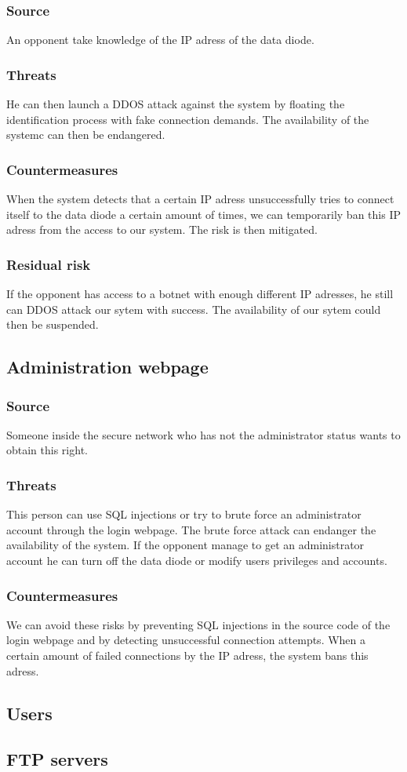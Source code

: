 \documentclass[a4paper,11pt]{article}
\begin{document}
\subsubsection{Source}
An opponent take knowledge of the IP adress of the data diode.
\subsubsection{Threats}
He can then launch a DDOS attack against the system by floating the identification process with fake connection demands. The availability of the systemc can then be endangered.
\subsubsection{Countermeasures}
When the system detects that a certain IP adress unsuccessfully tries to connect itself to the data diode a certain amount of times, we can temporarily ban this IP adress from the access to our system.  The risk is then mitigated.
\subsubsection{Residual risk}
If the opponent has access to a botnet with enough different IP adresses, he still can DDOS attack our sytem with success. The availability of our sytem could then be suspended.
\subsection{Administration webpage}
\subsubsection{Source}
Someone inside the secure network who has not the administrator status wants to obtain this right.
\subsubsection{Threats}
\begin{itemize}
This person can use SQL injections or try to brute force an administrator account through the login webpage. The brute force attack can endanger the availability of the system. If the opponent manage to get an administrator account he can turn off the data diode or modify users privileges and accounts.
\end{itemize}
\subsubsection{Countermeasures}
We can avoid these risks by preventing SQL injections in the source code of the login webpage and by detecting unsuccessful connection attempts. When a certain amount of failed connections by the IP adress, the system bans this adress.
\subsection{Users}
\subsection{FTP servers}
\end{document}
